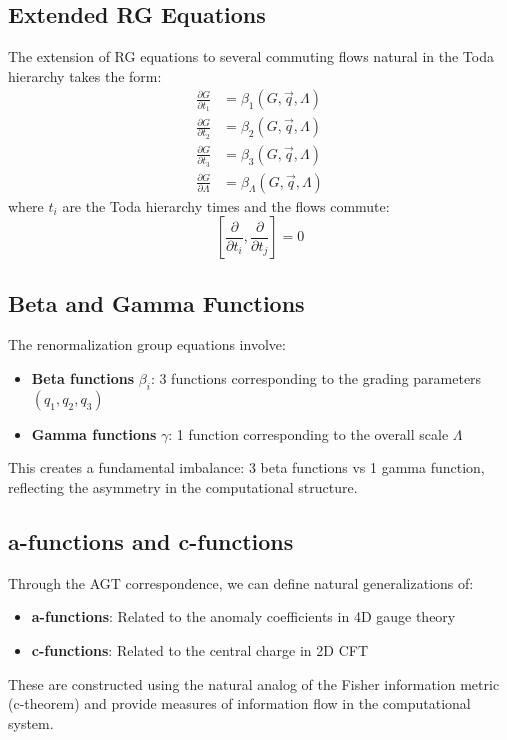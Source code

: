 \subsection{Extended RG Equations}

\begin{definition}
\label{def:extended-rg}
The extension of RG equations to several commuting flows natural in the Toda hierarchy takes the form:
\begin{align}
\frac{\partial G}{\partial t_1} &= \beta_1(G, \vec{q}, \Lambda) \\
\frac{\partial G}{\partial t_2} &= \beta_2(G, \vec{q}, \Lambda) \\
\frac{\partial G}{\partial t_3} &= \beta_3(G, \vec{q}, \Lambda) \\
\frac{\partial G}{\partial \Lambda} &= \beta_\Lambda(G, \vec{q}, \Lambda)
\end{align}
where $t_i$ are the Toda hierarchy times and the flows commute:
\[
[\frac{\partial}{\partial t_i}, \frac{\partial}{\partial t_j}] = 0
\]
\end{definition}

\subsection{Beta and Gamma Functions}

\begin{definition}
\label{def:beta-gamma}
The renormalization group equations involve:
\begin{itemize}
\item \textbf{Beta functions} $\beta_i$: 3 functions corresponding to the grading parameters $(q_1, q_2, q_3)$
\item \textbf{Gamma functions} $\gamma$: 1 function corresponding to the overall scale $\Lambda$
\end{itemize}

This creates a fundamental imbalance: 3 beta functions vs 1 gamma function, reflecting the asymmetry in the computational structure.
\end{definition}

\subsection{a-functions and c-functions}

\begin{conjecture}
\label{conj:a-c-functions}
Through the AGT correspondence, we can define natural generalizations of:
\begin{itemize}
\item \textbf{a-functions}: Related to the anomaly coefficients in 4D gauge theory
\item \textbf{c-functions}: Related to the central charge in 2D CFT
\end{itemize}

These are constructed using the natural analog of the Fisher information metric (c-theorem) and provide measures of information flow in the computational system.
\end{conjecture}


